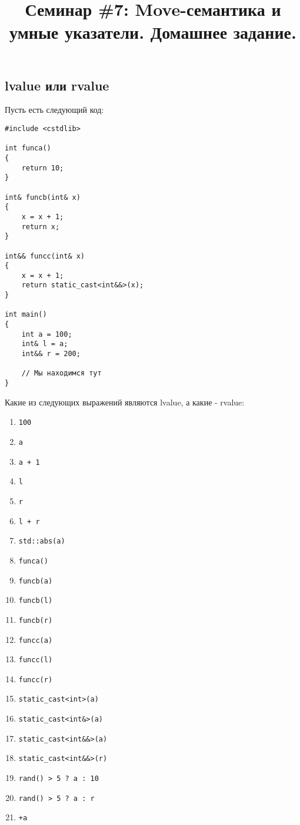 \documentclass{article}
\begin{document}
\title{Семинар \#7: Move-семантика и умные указатели. Домашнее задание.\vspace{-5ex}}\date{}\maketitle

\subsection{lvalue или rvalue}


Пусть есть следующий код:
\begin{lstlisting}
#include <cstdlib>

int funca()
{
    return 10;
}

int& funcb(int& x)
{
    x = x + 1;
    return x;
}

int&& funcc(int& x)
{
    x = x + 1;
    return static_cast<int&&>(x);
}

int main()
{
    int a = 100;
    int& l = a;
    int&& r = 200;
    
    // Мы находимся тут
}
\end{lstlisting}

Какие из следующих выражений являются lvalue, а какие - rvalue:

\begin{multicols}{3}
\begin{enumerate}
\item \texttt{100}
\item \texttt{a}
\item \texttt{a + 1}
\item \texttt{l}
\item \texttt{r}
\item \texttt{l + r}
\item \texttt{std::abs(a)}
\item \texttt{funca()}
\item \texttt{funcb(a)}
\item \texttt{funcb(l)}
\item \texttt{funcb(r)}
\item \texttt{funcc(a)}
\item \texttt{funcc(l)}
\item \texttt{funcc(r)}
\item \texttt{static\_cast<int>(a)}
\item \texttt{static\_cast<int\&>(a)}
\item \texttt{static\_cast<int\&\&>(a)}
\item \texttt{static\_cast<int\&\&>(r)}
\item \texttt{rand() > 5 ? a : 10}
\item \texttt{rand() > 5 ? a : r}
\item \texttt{+a}
\end{enumerate}
\end{multicols}
\end{document}
